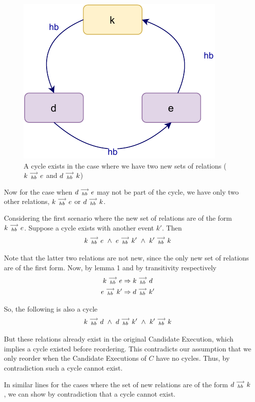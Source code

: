     \begin{figure}[H]
        \centering
        \includegraphics[scale=0.7]{Q4(a)_3.pdf}
        \caption{A cycle exists in the case where we have two new sets of relations ($k\stackrel{\longrightarrow}{_{hb}}e$ and $d\stackrel{\longrightarrow}{_{hb}}k$) }
        \label{fig:my_label}
    \end{figure}


    Now for the case when $d\stackrel{\longrightarrow}{_{hb}}e$ may not be part of the cycle, we have only two other relations, $k\stackrel{\longrightarrow}{_{hb}}e$ or $d\stackrel{\longrightarrow}{_{hb}}k$.

    Considering the first scenario where the new set of relations are of the form $k\stackrel{\longrightarrow}{_{hb}}e$. Suppose a cycle exists with another event $k'$. Then 
    \[
        k\stackrel{\longrightarrow}{_{hb}}e \ \wedge \
        e\stackrel{\longrightarrow}{_{hb}}k' \ \wedge \
        k'\stackrel{\longrightarrow}{_{hb}}k
    \]

    Note that the latter two relations are not new, since the only new set of relations are of the first form. Now, by lemma 1 and by transitivity respectively
    \begin{gather*}
        k\stackrel{\longrightarrow}{_{hb}}e \Rightarrow k\stackrel{\longrightarrow}{_{hb}}d \\
        e\stackrel{\longrightarrow}{_{hb}}k' \Rightarrow d\stackrel{\longrightarrow}{_{hb}}k'    
    \end{gather*}

    So, the following is also a cycle
    \[
        k\stackrel{\longrightarrow}{_{hb}}d \ \wedge \
        d\stackrel{\longrightarrow}{_{hb}}k' \ \wedge \
        k'\stackrel{\longrightarrow}{_{hb}}k
    \]

    But these relations already exist in the original Candidate Execution, which implies a cycle existed before reordering. This contradicts our assumption that we only reorder when the Candidate Executions of $C$ have no cycles. Thus, by contradiction such a cycle cannot exist.

    In similar lines for the cases where the set of new relations are of the form $d\stackrel{\longrightarrow}{_{hb}}k$, we can show by contradiction that a cycle cannot exist.

